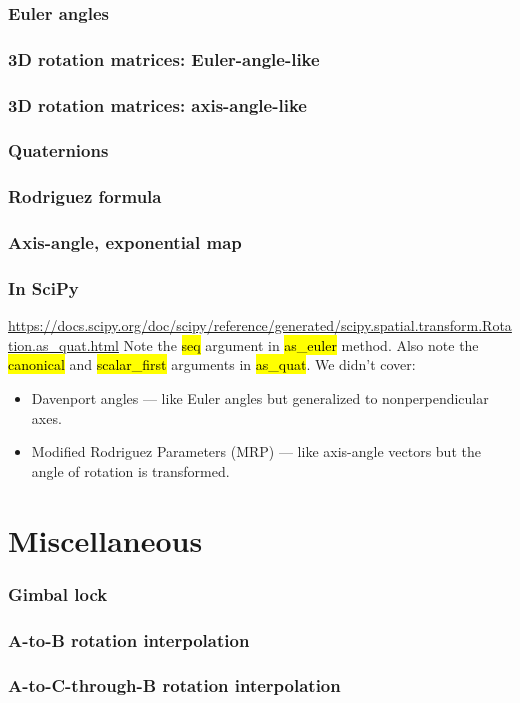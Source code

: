 \documentclass{beamer}
\begin{document}
\begin{frame}
\frametitle{Euler angles}
\end{frame}


\begin{frame}
\frametitle{3D rotation matrices: Euler-angle-like}
\end{frame}


\begin{frame}
\frametitle{3D rotation matrices: axis-angle-like}
\end{frame}


\begin{frame}
\frametitle{Quaternions}
\end{frame}


\begin{frame}
\frametitle{Rodriguez formula}
\end{frame}
    
    

\begin{frame}
\frametitle{Axis-angle, exponential map}
\end{frame}
    

\begin{frame}
\frametitle{In SciPy}
\url{https://docs.scipy.org/doc/scipy/reference/generated/scipy.spatial.transform.Rotation.as_quat.html}
\vfill
Note the \hl{seq} argument in \hl{as\_euler} method. Also note the \hl{canonical} and \hl{scalar\_first} arguments in \hl{as\_quat}.
\vfill
We didn't cover: 
\begin{itemize}
	\item Davenport angles --- like Euler angles but generalized to nonperpendicular axes.  
	\item Modified Rodriguez Parameters (MRP) --- like axis-angle vectors but the angle of rotation is transformed.
\end{itemize}
\end{frame}


\section{Miscellaneous}


\begin{frame}
\frametitle{Gimbal lock}
\end{frame}


\begin{frame}
\frametitle{A-to-B rotation interpolation}
\end{frame}


\begin{frame}
\frametitle{A-to-C-through-B rotation interpolation}
\end{frame}



\end{document}
